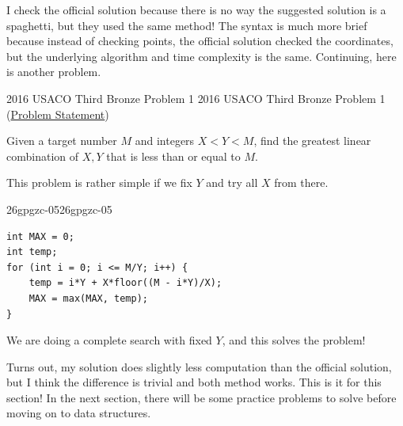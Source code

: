 \documentclass[../../../main.tex]{subfiles}
\begin{document}
I check the official solution because there is no way the suggested
solution is a spaghetti, but they used the same method! The syntax
is much more brief because instead of checking points, the official
solution checked the coordinates, but the underlying algorithm and
time complexity is the same. Continuing, here is another problem.

\begin{problem}
{2016 USACO Third Bronze Problem 1}
{2016 USACO Third Bronze Problem 1}
(\href{https://usaco.org/index.php?page=viewproblem2&cpid=615}{Problem Statement})

Given a target number $M$ and integers $X < Y < M$, find the greatest
linear combination of $X, Y$ that is less than or equal to $M$.
\end{problem}
\begin{solution}
This problem is rather simple if we fix $Y$ and try all $X$ from
there.

\begin{cppboxSolution}{26gpgzc-05}{26gpgzc-05}
\begin{lstlisting}[style=cppstyle]
int MAX = 0;
int temp;
for (int i = 0; i <= M/Y; i++) {
    temp = i*Y + X*floor((M - i*Y)/X);
    MAX = max(MAX, temp);
}
\end{lstlisting}
\end{cppboxSolution}

We are doing a complete search with fixed $Y$, and this solves the
problem!
\end{solution}

Turns out, my solution does slightly less computation than the
official solution, but I think the difference is trivial and both
method works. This is it for this section! In the next section,
there will be some practice problems to solve before moving on to
data structures.
\end{document}
